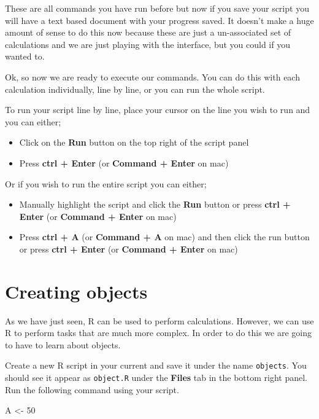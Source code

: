 \documentclass[
]{book}
\newenvironment{Shaded}{\begin{snugshade}}{\end{snugshade}}
\newcommand{\DecValTok}[1]{\textcolor[rgb]{0.00,0.00,0.81}{#1}}
\newcommand{\NormalTok}[1]{#1}
\newcommand{\OtherTok}[1]{\textcolor[rgb]{0.56,0.35,0.01}{#1}}
\providecommand{\tightlist}{%
  \setlength{\itemsep}{0pt}\setlength{\parskip}{0pt}}
\begin{document}
These are all commands you have run before but now if you save your script you will have a text based document with your progress saved. It doesn't make a huge amount of sense to do this now because these are just a un-associated set of calculations and we are just playing with the interface, but you could if you wanted to.

Ok, so now we are ready to execute our commands. You can do this with each calculation individually, line by line, or you can run the whole script.

To run your script line by line, place your cursor on the line you wish to run and you can either;

\begin{itemize}
\tightlist
\item
  Click on the \textbf{Run} button on the top right of the script panel
\item
  Press \textbf{ctrl + Enter} (or \textbf{Command + Enter} on mac)
\end{itemize}

Or if you wish to run the entire script you can either;

\begin{itemize}
\tightlist
\item
  Manually highlight the script and click the \textbf{Run} button or press \textbf{ctrl + Enter} (or \textbf{Command + Enter} on mac)
\item
  Press \textbf{ctrl + A} (or \textbf{Command + A} on mac) and then click the run button or press \textbf{ctrl + Enter} (or \textbf{Command + Enter} on mac)
\end{itemize}

\hypertarget{creating-objects}{%
\section{Creating objects}\label{creating-objects}}

As we have just seen, R can be used to perform calculations. However, we can use R to perform tasks that are much more complex. In order to do this we are going to have to learn about objects.

Create a new R script in your current and save it under the name \texttt{objects}. You should see it appear as \texttt{object.R} under the \textbf{Files} tab in the bottom right panel. Run the following command using your script.

\begin{Shaded}
\begin{Highlighting}[]
\NormalTok{A }\OtherTok{\textless{}{-}} \DecValTok{50}
\end{Highlighting}
\end{Shaded}
\end{document}
